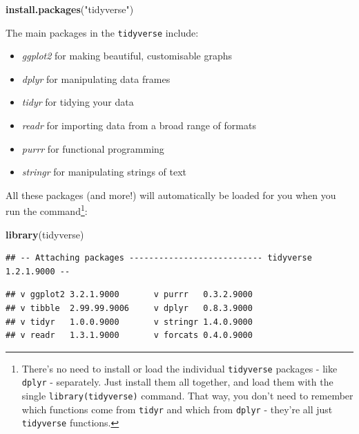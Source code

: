 \documentclass[]{book}
\newenvironment{Shaded}{\begin{snugshade}}{\end{snugshade}}
\newcommand{\KeywordTok}[1]{\textcolor[rgb]{0.13,0.29,0.53}{\textbf{#1}}}
\newcommand{\NormalTok}[1]{#1}
\newcommand{\StringTok}[1]{\textcolor[rgb]{0.31,0.60,0.02}{#1}}
\providecommand{\tightlist}{%
  \setlength{\itemsep}{0pt}\setlength{\parskip}{0pt}}
\let\rmarkdownfootnote\footnote%
\def\footnote{\protect\rmarkdownfootnote}
\begin{document}
\begin{Shaded}
\begin{Highlighting}[]
\KeywordTok{install.packages}\NormalTok{(}\StringTok{"tidyverse"}\NormalTok{)}
\end{Highlighting}
\end{Shaded}

The main packages in the \texttt{tidyverse} include:

\begin{itemize}
\tightlist
\item
  \emph{ggplot2} for making beautiful, customisable graphs
\item
  \emph{dplyr} for manipulating data frames
\item
  \emph{tidyr} for tidying your data
\item
  \emph{readr} for importing data from a broad range of formats
\item
  \emph{purrr} for functional programming
\item
  \emph{stringr} for manipulating strings of text
\end{itemize}

All these packages (and more!) will automatically be loaded for you when you run the command\footnote{There's no need to install or load the individual \texttt{tidyverse} packages - like \texttt{dplyr} - separately. Just install them all together, and load them with the single \texttt{library(tidyverse)} command. That way, you don't need to remember which functions come from \texttt{tidyr} and which from \texttt{dplyr} - they're all just \texttt{tidyverse} functions.}:

\begin{Shaded}
\begin{Highlighting}[]
\KeywordTok{library}\NormalTok{(tidyverse)}
\end{Highlighting}
\end{Shaded}

\begin{verbatim}
## -- Attaching packages --------------------------- tidyverse 1.2.1.9000 --
\end{verbatim}

\begin{verbatim}
## v ggplot2 3.2.1.9000       v purrr   0.3.2.9000  
## v tibble  2.99.99.9006     v dplyr   0.8.3.9000  
## v tidyr   1.0.0.9000       v stringr 1.4.0.9000  
## v readr   1.3.1.9000       v forcats 0.4.0.9000
\end{verbatim}
\end{document}
